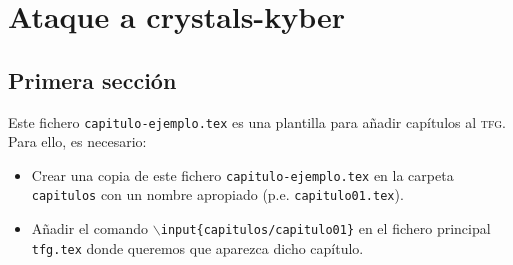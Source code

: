 
\chapter{Ataque a crystals-kyber}

\section{Primera sección}

Este fichero \texttt{capitulo-ejemplo.tex} es una plantilla para añadir capítulos al \textsc{tfg}. Para ello, es necesario:
\begin{itemize}
  \item Crear una copia de este fichero \texttt{capitulo-ejemplo.tex} en la carpeta \texttt{capitulos} con un nombre apropiado (p.e. \texttt{capitulo01.tex}).
  \item Añadir el comando \texttt{$\backslash$input\{capitulos/capitulo01\}} en el fichero principal \texttt{tfg.tex} donde queremos que aparezca dicho capítulo.
\end{itemize}


\endinput
